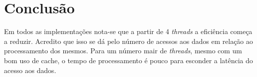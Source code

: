 \chapter{Conclusão}
\label{cha:conclusao}

Em todos as implementações nota-se que a partir de 4 \textit{threads} a eficiência começa a reduzir. Acredito que isso se dá pelo número de acessos aos dados em relação ao processamento dos mesmos. Para um número mair de \textit{threads}, mesmo com um bom uso de cache, o tempo de processamento é pouco para esconder a latência do acesso aos dados.